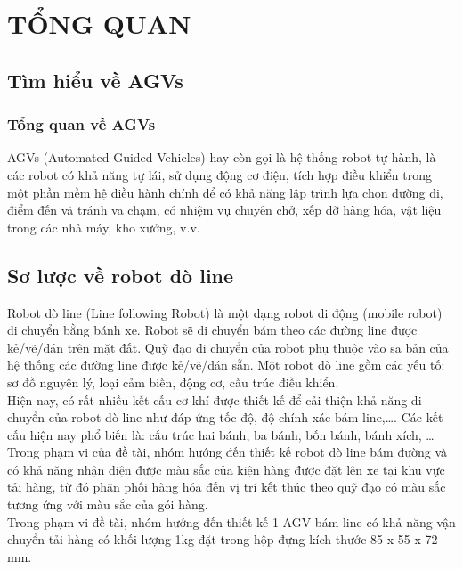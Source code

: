 \chapter{TỔNG QUAN}
    \section{Tìm hiểu về AGVs}
    \subsection{Tổng quan về AGVs}
    \hspace*{0.6cm}AGVs (Automated Guided Vehicles) hay còn gọi là hệ thống robot tự hành, là các robot có khả năng tự lái, sử dụng động cơ điện,
    tích hợp điều khiển trong một phần mềm hệ điều hành chính để có khả năng lập trình lựa chọn đường đi, điểm đến và tránh va chạm, 
    có nhiệm vụ chuyên chở, xếp dỡ hàng hóa, vật liệu trong các nhà máy, kho xưởng, v.v.
    
    \section{Sơ lược về robot dò line}
        \hspace*{0.6cm}Robot dò line (Line following Robot) là một dạng robot di động (mobile robot) di
        chuyển bằng bánh xe. Robot sẽ di chuyển bám theo các đường line được kẻ/vẽ/dán trên
        mặt đất. Quỹ đạo di chuyển của robot phụ thuộc vào sa bản của hệ thống các đường line
        được kẻ/vẽ/dán sẵn. Một robot dò line gồm các yếu tố: sơ đồ nguyên lý, loại cảm biến,
        động cơ, cấu trúc điều khiển. \\
        \hspace*{0.6cm}Hiện nay, có rất nhiều kết cấu cơ khí được thiết kế để cải thiện khả năng di chuyển
        của robot dò line như đáp ứng tốc độ, độ chính xác bám line,\dots. Các kết cấu hiện nay
        phổ biến là: cấu trúc hai bánh, ba bánh, bốn bánh, bánh xích, \dots \\
        \hspace*{0.6cm} Trong phạm vi của đề tài, nhóm hướng đến thiết kế robot dò line bám đường và
        có khả năng nhận diện được màu sắc của kiện hàng được đặt lên xe tại khu vực tải hàng, từ đó phân phối hàng hóa đến vị trí kết thúc theo quỹ đạo có màu sắc tương ứng với màu sắc của gói hàng.\\
        \hspace*{0.6cm}Trong phạm vi đề tài, nhóm hướng đến thiết kế 1 AGV bám line có khả năng vận chuyển tải hàng có khối lượng 1kg đặt trong hộp đựng kích thước 85 x 55 x 72 mm.


